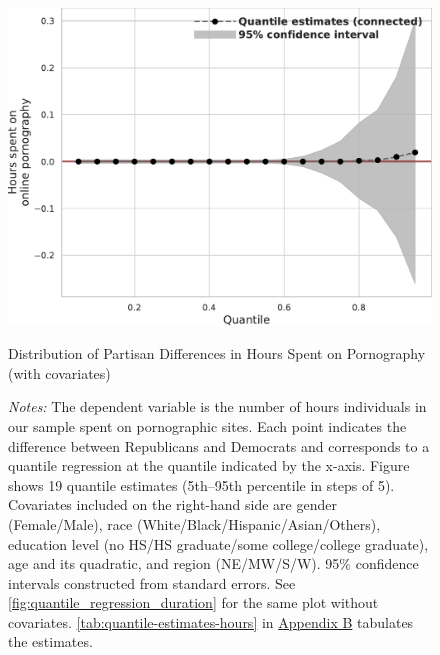 \documentclass[12pt,twoside]{article}
\begin{document}
\begin{figure}[!ht]
	\centering
	\includegraphics[width=.7\linewidth]{figs/quantile_reg_covariates_duration_adult.pdf}
	\caption{Distribution of Partisan Differences in Hours Spent on Pornography (with covariates)}
	\caption*{\footnotesize \emph{Notes:} 
		The dependent variable is the number of hours individuals in our sample spent on pornographic sites.
		Each point indicates the difference between Republicans and Democrats and corresponds to a quantile regression at the quantile indicated by the x-axis.
  Figure shows 19 quantile estimates (5th--95th percentile in steps of 5).
		Covariates included on the right-hand side are gender (Female/Male), race (White/Black/Hispanic/Asian/Others), education level (no HS/HS graduate/some college/college graduate), age and its quadratic, and region (NE/MW/S/W).
		95\% confidence intervals constructed from standard errors.
		See \cref{fig:quantile_regression_duration} for the same plot without covariates.
  \cref{tab:quantile-estimates-hours} in \hyperref[sm:smB]{Appendix B} tabulates the estimates.
	}
	\label{fig:quantile_regression_duration_covariates}
\end{figure}
\end{document}
